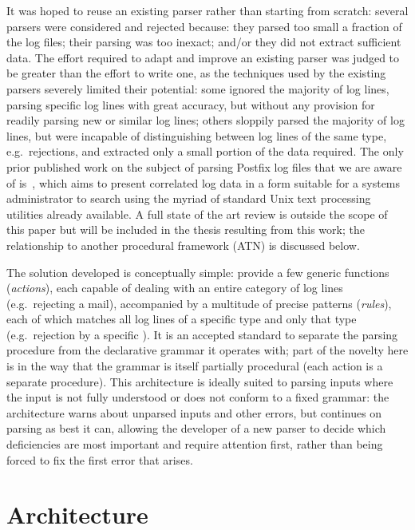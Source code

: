\documentclass{svmult}
\begin{document}
It was hoped to reuse an existing parser rather than starting from scratch:
several parsers were considered and rejected because: they parsed too small
a fraction of the log files; their parsing was too inexact; and/or they did
not extract sufficient data.  The effort required to adapt and improve an
existing parser was judged to be greater than the effort to write one, as
the techniques used by the existing parsers severely limited their
potential: some ignored the majority of log lines, parsing specific log
lines with great accuracy, but without any provision for readily parsing
new or similar log lines; others sloppily parsed the majority of log lines,
but were incapable of distinguishing between log lines of the same type,
e.g.\ rejections, and extracted only a small portion of the data required.
The only prior published work on the subject of parsing Postfix log files
that we are aware of is~\cite{log-mail-analyser}, which aims to present
correlated log data in a form suitable for a systems administrator to
search using the myriad of standard Unix text processing utilities already
available.  A full state of the art review is outside the scope of this
paper but will be included in the thesis resulting from this work; the
relationship to another procedural framework (ATN) is discussed below.

The solution developed is conceptually simple: provide a few generic
functions (\textit{actions\/}), each capable of dealing with an entire
category of log lines (e.g.\ rejecting a mail), accompanied by a multitude
of precise patterns (\textit{rules\/}), each of which matches all log lines
of a specific type and only that type (e.g.\ rejection by a specific
\DNSBL{}).  It is an accepted standard to separate the parsing procedure
from the declarative grammar it operates with; part of the novelty here is
in the way that the grammar is itself partially procedural (each action is
a separate procedure).  This architecture is ideally suited to parsing
inputs where the input is not fully understood or does not conform to a
fixed grammar: the architecture warns about unparsed inputs and other
errors, but continues on parsing as best it can, allowing the developer of
a new parser to decide which deficiencies are most important and require
attention first, rather than being forced to fix the first error that
arises.

\section{Architecture}
\end{document}
